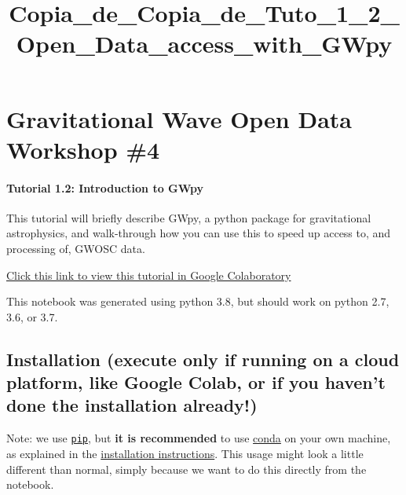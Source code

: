 \documentclass[11pt]{article}
\title{Copia\_de\_Copia\_de\_Tuto\_1\_2\_Open\_Data\_access\_with\_GWpy}
\begin{document}
    
    \maketitle
    
    

    
    \hypertarget{gravitational-wave-open-data-workshop-4}{%
\section{Gravitational Wave Open Data Workshop
\#4}\label{gravitational-wave-open-data-workshop-4}}

\hypertarget{tutorial-1.2-introduction-to-gwpy}{%
\paragraph{Tutorial 1.2: Introduction to
GWpy}\label{tutorial-1.2-introduction-to-gwpy}}

This tutorial will briefly describe GWpy, a python package for
gravitational astrophysics, and walk-through how you can use this to
speed up access to, and processing of, GWOSC data.

\href{https://colab.research.google.com/github/gw-odw/odw-2021/blob/master/Day_1/Tuto\%201.2\%20Open\%20Data\%20access\%20with\%20GWpy.ipynb}{Click
this link to view this tutorial in Google Colaboratory}

This notebook was generated using python 3.8, but should work on python
2.7, 3.6, or 3.7.

    \hypertarget{installation-execute-only-if-running-on-a-cloud-platform-like-google-colab-or-if-you-havent-done-the-installation-already}{%
\subsection{Installation (execute only if running on a cloud platform,
like Google Colab, or if you haven't done the installation
already!)}\label{installation-execute-only-if-running-on-a-cloud-platform-like-google-colab-or-if-you-havent-done-the-installation-already}}

Note: we use
\href{https://docs.python.org/3.6/installing/}{\texttt{pip}}, but
\textbf{it is recommended} to use
\href{https://docs.ligo.org/lscsoft/conda/}{conda} on your own machine,
as explained in the
\href{https://github.com/gw-odw/odw-2021\%7C/blob/master/setup.md}{installation
instructions}. This usage might look a little different than normal,
simply because we want to do this directly from the notebook.
\end{document}
